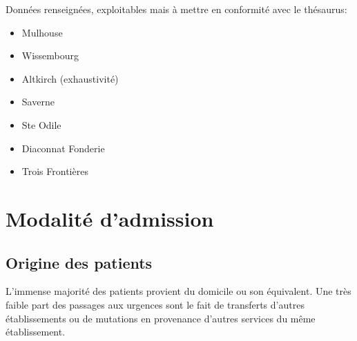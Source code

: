 \documentclass[12pt,english,french,twoside]{report}\usepackage[]{graphicx}\usepackage[]{color}
\begin{document}
Données renseignées, exploitables mais à mettre en conformité avec le thésaurus:
\begin{itemize}
  \item Mulhouse
  \item Wissembourg
  \item Altkirch (exhaustivité)
  \item Saverne
  \item Ste Odile
  \item Diaconnat Fonderie
  \item Trois Frontières
\end{itemize}


\chapter{Modalité d'admission}



\section*{Origine des patients}

L'immense majorité des patients provient du domicile ou son équivalent. Une très faible part des passages aux urgences sont le fait de transferts d'autres établissements ou de mutations en provenance d'autres services du même établissement.
\end{document}
